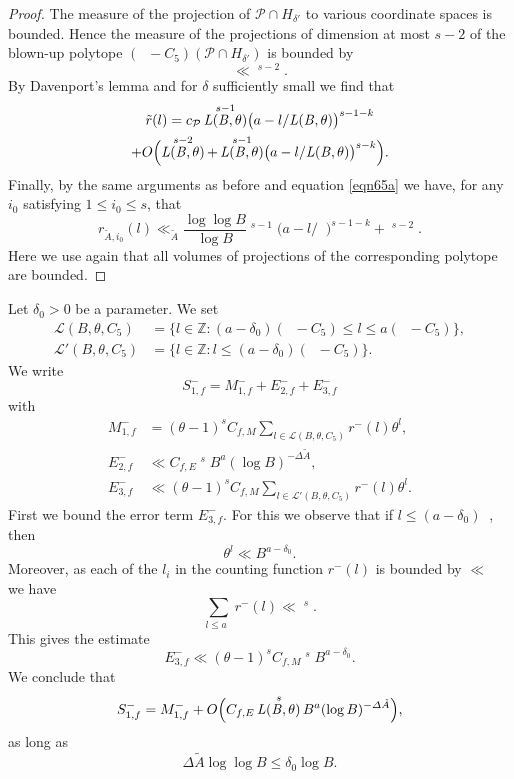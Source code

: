 \documentclass[11pt]{article}
\numberwithin{equation}{section}
\DeclareMathOperator{\LBt}{\mathit{L(B,\theta)}}
\newcommand{\cLBtpC}{\calL(B,\theta,C_5)}
\newcommand{\cLBtm}{\calL'(B,\theta,C_5)}
\let\del\delta
\let\vardel\varDelta
\let\tet\theta
\newcommand{\calL}{\mathcal{L}}
\newcommand{\calP}{\mathcal{P}}
\newcommand\ZZ{\mathbb{Z}}
\theoremstyle{definition}
\numberwithin{theorem}{section}
\begin{document}
\begin{proof}
The measure of the projection of $\calP\cap H_{\del'}$ to various coordinate spaces is bounded. Hence the measure of the projections of dimension at most $s-2$ of the blown-up polytope $\left(\LBt -C_5\right)(\calP\cap H_{\del'})$ is bounded by\vspace*{-3pt}
\[
\ll \LBt^{s-2}.
\]
By Davenport's lemma \cite{davenport} and for $\del$ sufficiently small we find that
\begin{multline*}
\tilde{r}(l)=c_{\calP} \LBt^{s-1} \bigl(a- l/{\LBt}\bigr)^{s-1-k} \\
+O\Bigl(\LBt^{s-2}+ \LBt^{s-1} \bigl(a- l/{\LBt}\bigr)^{s-k} \Bigr).
\end{multline*}
Finally, by the same arguments as before and equation \eqref{eqn65a} we have, for any $i_0$ satis\-fying $1\leq i_0\leq s$, that\vspace*{-3pt}
\[
r_{\tilde{A},i_0}(l) \ll_{\tilde{A}} \frac{\log \log B}{\log B}\LBt^{s-1} \bigl(a- l/{\LBt}\bigr)^{s-1-k}+\LBt^{s-2}.
\]
Here we use again that all volumes of projections of the corresponding polytope are bounded.
\end{proof}

Let $\del_0>0$ be a parameter. We set
\begin{align*}
\cLBtpC&=\{l\in\ZZ:(a-\del_0)(\LBt -C_5) \leq l\leq a (\LBt - C_5)\},\\
\cLBtm&=\{l\in\ZZ:l\leq(a-\del_0)(\LBt -C_5)\}.
\end{align*}
We write
\[
S_{1,f}^- = M_{1,f}^-+ E_{2,f}^- + E_{3,f}^-
\]
with
\begin{align*}
M_{1,f}^-&= (\tet -1)^s C_{f,M} \sum_{l\in\cLBtpC} r^-(l) \tet^l,
\\
E_{2,f}^-&\ll C_{f,E} \LBt^s B^{a} (\log B)^{-\vardel \tilde{A}},\\
E_{3,f}^- &\ll (\tet -1)^s C_{f,M} \sum_{l\in\cLBtm} r^-(l) \tet^l.
\end{align*}
First we bound the error term $E_{3,f}^-$. For this we observe that if $l\leq (a-\del_0) \LBt$, then
\[
\tet^l \ll B^{a-\del_0}.
\]
Moreover, as each of the $l_i$ in the counting function $r^-(l)$ is bounded by $\ll \LBt$ we have
\[
\sum_{l\leq a \LBt} r^-(l) \ll \LBt^s.
\]
This gives the estimate
\[
E_{3,f}^-\ll (\tet -1)^s C_{f,M} \LBt^{s} B^{a-\del_0}.
\]
We conclude that
\[
S_{1,f}^-= M_{1,f}^- + O\Bigl(C_{f,E} \LBt^s B^{a} (\log B)^{-\vardel \tilde{A}}\Bigr),
\]
as long as
\begin{equation}\label{eqndelkap}
\Delta \tilde{A} \log \log B \leq \del_0 \log B.
\end{equation}
\end{document}
